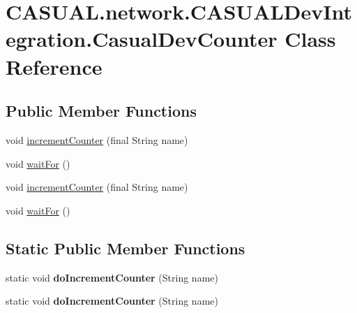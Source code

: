 \hypertarget{class_c_a_s_u_a_l_1_1network_1_1_c_a_s_u_a_l_dev_integration_1_1_casual_dev_counter}{\section{C\-A\-S\-U\-A\-L.\-network.\-C\-A\-S\-U\-A\-L\-Dev\-Integration.\-Casual\-Dev\-Counter Class Reference}
\label{class_c_a_s_u_a_l_1_1network_1_1_c_a_s_u_a_l_dev_integration_1_1_casual_dev_counter}
}
\subsection*{Public Member Functions}
\begin{DoxyCompactItemize}
\item 
void \hyperlink{class_c_a_s_u_a_l_1_1network_1_1_c_a_s_u_a_l_dev_integration_1_1_casual_dev_counter_a5b176f43b45ffdbdd412c5f0e18d5e5a}{increment\-Counter} (final String name)
\item 
void \hyperlink{class_c_a_s_u_a_l_1_1network_1_1_c_a_s_u_a_l_dev_integration_1_1_casual_dev_counter_ac52b1d3350102f9efb0794744d6218d4}{wait\-For} ()
\item 
void \hyperlink{class_c_a_s_u_a_l_1_1network_1_1_c_a_s_u_a_l_dev_integration_1_1_casual_dev_counter_a5b176f43b45ffdbdd412c5f0e18d5e5a}{increment\-Counter} (final String name)
\item 
void \hyperlink{class_c_a_s_u_a_l_1_1network_1_1_c_a_s_u_a_l_dev_integration_1_1_casual_dev_counter_ac52b1d3350102f9efb0794744d6218d4}{wait\-For} ()
\end{DoxyCompactItemize}
\subsection*{Static Public Member Functions}
\begin{DoxyCompactItemize}
\item 
\hypertarget{class_c_a_s_u_a_l_1_1network_1_1_c_a_s_u_a_l_dev_integration_1_1_casual_dev_counter_a2f3946b6653aa6a935f906ae5eb7093d}{static void {\bfseries do\-Increment\-Counter} (String name)}\label{class_c_a_s_u_a_l_1_1network_1_1_c_a_s_u_a_l_dev_integration_1_1_casual_dev_counter_a2f3946b6653aa6a935f906ae5eb7093d}

\item 
\hypertarget{class_c_a_s_u_a_l_1_1network_1_1_c_a_s_u_a_l_dev_integration_1_1_casual_dev_counter_a2f3946b6653aa6a935f906ae5eb7093d}{static void {\bfseries do\-Increment\-Counter} (String name)}\label{class_c_a_s_u_a_l_1_1network_1_1_c_a_s_u_a_l_dev_integration_1_1_casual_dev_counter_a2f3946b6653aa6a935f906ae5eb7093d}

\end{DoxyCompactItemize}
